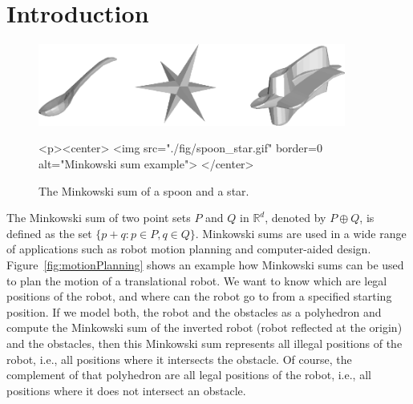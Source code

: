 
\ccParDims


%

\section{Introduction}

\begin{figure}[h]
  \begin{ccTexOnly}
    \begin{center}
      \includegraphics[width=0.9\textwidth]{Minkowski_sum_3/fig/spoon_star}
    \end{center}
  \end{ccTexOnly}
  \begin{ccHtmlOnly}
    <p><center>
    <img src="./fig/spoon_star.gif" border=0 alt="Minkowski sum example">
    </center>
  \end{ccHtmlOnly}
  \caption{The Minkowski sum of a spoon and a star.}
\end{figure}

The Minkowski sum of two point sets $P$ and $Q$ in $\mathbb{R}^d$, denoted by
$P \oplus Q$, is defined as the set $\{p+q:p \in P, q \in Q
\}$. Minkowski sums are used in a wide range of applications such as
robot motion planning and computer-aided
design. Figure~\ref{fig:motionPlanning} shows an example how Minkowski
sums can be used to plan the motion of a translational robot. We want
to know which are legal positions of the robot, and where can the
robot go to from a specified starting position. If we model both, the
robot and the obstacles as a polyhedron and compute the Minkowski sum
of the inverted robot (robot reflected at the origin) and the obstacles,
then this Minkowski sum represents all illegal positions of the robot,
i.e., all positions where it intersects the obstacle. Of course, the
complement of that polyhedron are all legal positions of the robot,
i.e., all positions where it does not intersect an obstacle.


